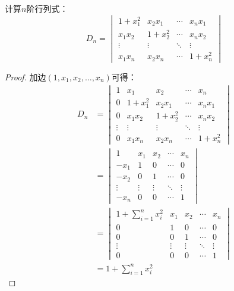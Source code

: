 \begin{theorem}
	计算$n$阶行列式：
	\begin{equation*}
		D_n=
		\begin{vmatrix}
			1+x_1^2 & x_2x_1 &\cdots & x_nx_1 \\
			x_1x_2 & 1+x_2^2 & \cdots & x_nx_2 \\
			\vdots & \vdots & \ddots & \vdots \\
			x_1x_n & x_2x_n & \cdots & 1+x_n^2
		\end{vmatrix}
	\end{equation*}
\end{theorem}
\begin{proof}
	加边$(1,x_1,x_2,\dots,x_n)$可得：
	\begin{align*}
		D_n&=
		\begin{vmatrix}
			1 & x_1 & x_2 & \cdots & x_n \\
			0 & 1+x_1^2 & x_2x_1 &\cdots & x_nx_1 \\
			0 & x_1x_2 & 1+x_2^2 & \cdots & x_nx_2 \\
			\vdots & \vdots & \vdots & \ddots & \vdots \\
			0 & x_1x_n & x_2x_n & \cdots & 1+x_n^2
		\end{vmatrix} \\
		&=
		\begin{vmatrix}
			1 & x_1 & x_2 & \cdots & x_n \\
			-x_1 & 1 & 0 &\cdots & 0 \\
			-x_2 & 0 & 1 & \cdots & 0 \\
			\vdots & \vdots & \vdots & \ddots & \vdots \\
			-x_n & 0 & 0 & \cdots & 1
		\end{vmatrix} \\
		&=
		\begin{vmatrix}
			1+\sum\limits_{i=1}^{n}x_i^2 & x_1 & x_2 & \cdots & x_n \\
			0 & 1 & 0 &\cdots & 0 \\
			0 & 0 & 1 & \cdots & 0 \\
			\vdots & \vdots & \vdots & \ddots & \vdots \\
			0 & 0 & 0 & \cdots & 1
		\end{vmatrix} \\
		&=1+\sum_{i=1}^{n}x_i^2
	\end{align*}
\end{proof}

